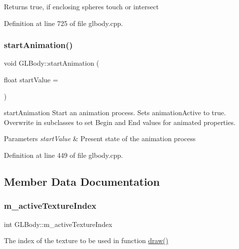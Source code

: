 Returns true, if enclosing spheres touch or intersect 

Definition at line 725 of file glbody.\+cpp.

\mbox{\label{class_g_l_body_a5620eb1389c1aeb5694e4e7fc8a9e88c}} 
\subsubsection{\texorpdfstring{startAnimation()}{startAnimation()}}
{\footnotesize\ttfamily void G\+L\+Body\+::start\+Animation (\begin{DoxyParamCaption}\item[{float}]{start\+Value = {} }\end{DoxyParamCaption})\hspace{0.3cm}{\ttfamily [virtual]}}



start\+Animation Start an animation process. Sets animation\+Active to true. Overwrite in subclasses to set Begin and End values for animated properties. 


\begin{DoxyParams}{Parameters}
{\em start\+Value} & Present state of the animation process \\
\hline
\end{DoxyParams}


Definition at line 449 of file glbody.\+cpp.



\subsection{Member Data Documentation}
\mbox{\label{class_g_l_body_ad21b09d906e63e5c222ccb96e4d242df}} 
\subsubsection{\texorpdfstring{m\_activeTextureIndex}{m\_activeTextureIndex}}
{\footnotesize\ttfamily int G\+L\+Body\+::m\+\_\+active\+Texture\+Index\hspace{0.3cm}{\ttfamily [protected]}}

The index of the texture to be used in function \mbox{\hyperlink{class_g_l_body_aaeb47c0a8cfc36caed81fc139c42ddfc}{draw()}} 

